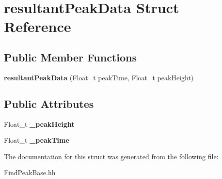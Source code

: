 \hypertarget{structresultant_peak_data}{}\section{resultant\+Peak\+Data Struct Reference}
\label{structresultant_peak_data}
\subsection*{Public Member Functions}
\begin{DoxyCompactItemize}
\item 
\hypertarget{structresultant_peak_data_a33b55c24f503ffd5e341b52105bd9e4b}{}{\bfseries resultant\+Peak\+Data} (Float\+\_\+t peak\+Time, Float\+\_\+t peak\+Height)\label{structresultant_peak_data_a33b55c24f503ffd5e341b52105bd9e4b}

\end{DoxyCompactItemize}
\subsection*{Public Attributes}
\begin{DoxyCompactItemize}
\item 
\hypertarget{structresultant_peak_data_abc8f4ed26aa12bd0a9b49527f7599c3b}{}Float\+\_\+t {\bfseries \+\_\+peak\+Height}\label{structresultant_peak_data_abc8f4ed26aa12bd0a9b49527f7599c3b}

\item 
\hypertarget{structresultant_peak_data_aac009547ef6ed9044d06d95a9dae9ce5}{}Float\+\_\+t {\bfseries \+\_\+peak\+Time}\label{structresultant_peak_data_aac009547ef6ed9044d06d95a9dae9ce5}

\end{DoxyCompactItemize}


The documentation for this struct was generated from the following file\+:\begin{DoxyCompactItemize}
\item 
Find\+Peak\+Base.\+hh\end{DoxyCompactItemize}
